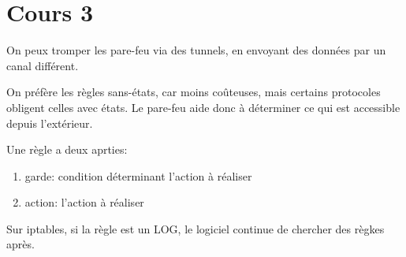 \section{Cours 3}
On peux tromper les pare-feu via des tunnels, en envoyant des donn\'ees par un canal diff\'erent.

On pr\'ef\`ere les r\`egles sans-\'etats, car moins co\^uteuses, mais certains protocoles obligent celles avec \'etats.
Le pare-feu aide donc \`a d\'eterminer ce qui est accessible depuis l'ext\'erieur.

Une r\`egle a deux aprties:
\begin{enumerate}
  \item garde: condition d\'eterminant l'action \`a r\'ealiser
  \item action: l'action \`a r\'ealiser
\end{enumerate}

Sur iptables, si la r\`egle est un LOG, le logiciel continue de chercher des r\`egkes apr\`es.
